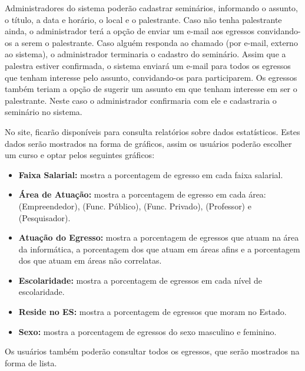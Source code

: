 Administradores do sistema poderão cadastrar seminários, informando o assunto, o título, a data e horário, o local e o palestrante. Caso não tenha palestrante ainda, o administrador terá a opção de enviar um e-mail aos egressos convidando-os a serem o palestrante. Caso alguém responda ao chamado (por e-mail, externo ao sistema), o administrador terminaria o cadastro do seminário. Assim que a palestra estiver confirmada, o sistema enviará um e-mail para todos os egressos que tenham interesse pelo assunto, convidando-os para participarem. Os egressos também teriam a opção de sugerir um assunto em que tenham interesse em ser o palestrante. Neste caso o administrador confirmaria com ele e cadastraria o seminário no sistema.


No site, ficarão disponíveis para consulta relatórios sobre dados estatísticos. Estes dados serão mostrados na forma de gráficos, assim os usuários poderão escolher um curso e optar pelos seguintes gráficos: 

\begin{itemize}
	
  	\item \textbf{Faixa Salarial:} mostra a porcentagem de egresso em cada faixa salarial.
  	
  	\item \textbf{Área de Atuação:} mostra a porcentagem de egresso em cada área: (Empreendedor), (Func. Público), (Func. Privado), (Professor) e (Pesquisador).
  	
  	\item \textbf{Atuação do Egresso:} mostra a porcentagem de egressos que atuam na área da informática, a porcentagem dos que atuam em áreas afins e a porcentagem dos que atuam em áreas não correlatas. 
  	
  	\item \textbf{Escolaridade:} mostra a porcentagem de egressos em cada nível de escolaridade. 
  	
  	\item \textbf{Reside no ES:} mostra a porcentagem de egressos que moram no Estado.
  	
  	\item \textbf{Sexo:} mostra a porcentagem de egressos do sexo masculino e feminino.
  	  	
\end{itemize}

Os usuários também poderão consultar todos os egressos, que serão mostrados na forma de lista. 











